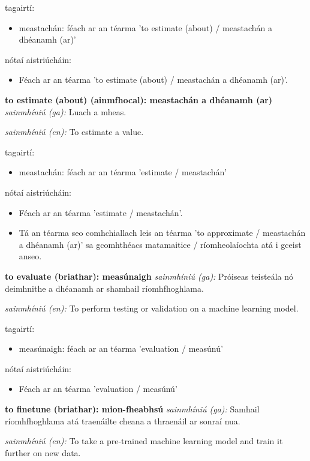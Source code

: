 \documentclass{article}
\begin{document}
tagairtí:
\begin{itemize}
	\item meastachán: féach ar an téarma 'to estimate (about) / meastachán a dhéanamh (ar)'
\end{itemize}

nótaí aistriúcháin:
\begin{itemize}
	\item Féach ar an téarma 'to estimate (about) / meastachán a dhéanamh (ar)'.
\end{itemize}


\textbf{to estimate (about) (ainmfhocal): meastachán a dhéanamh (ar)}
\textit{sainmhíniú (ga):} Luach a mheas.

\textit{sainmhíniú (en):} To estimate a value.

tagairtí:
\begin{itemize}
	\item meastachán: féach ar an téarma 'estimate  / meastachán'
\end{itemize}

nótaí aistriúcháin:
\begin{itemize}
	\item Féach ar an téarma 'estimate / meastachán'.
	\item Tá an téarma seo comhchiallach leis an téarma 'to approximate / meastachán a dhéanamh (ar)' sa gcomhthéacs matamaitice / ríomheolaíochta atá i gceist anseo.
\end{itemize}


\textbf{to evaluate (briathar): measúnaigh}
\textit{sainmhíniú (ga):} Próiseas teisteála nó deimhnithe a dhéanamh ar shamhail ríomhfhoghlama.

\textit{sainmhíniú (en):} To perform testing or validation on a machine learning model.

tagairtí:
\begin{itemize}
	\item measúnaigh: féach ar an téarma 'evaluation / measúnú'
\end{itemize}

nótaí aistriúcháin:
\begin{itemize}
	\item Féach ar an téarma 'evaluation / measúnú'
\end{itemize}


\textbf{to finetune (briathar): mion-fheabhsú}
\textit{sainmhíniú (ga):} Samhail ríomhfhoghlama atá traenáilte cheana a thraenáil ar sonraí nua.

\textit{sainmhíniú (en):} To take a pre-trained machine learning model and train it further on new data.
\end{document}

